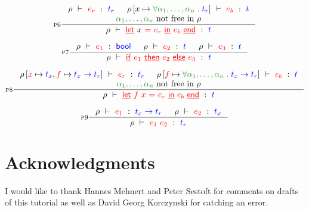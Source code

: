 \documentclass[a4paper]{article}
\newcommand{\RULE}[1]{\textsc{#1}}
\newcommand{\kwd}[1]{\ensuremath{\mathsf{\textcolor{term}{\underline{#1}}}}}
\newcommand{\expr}[1]{\ensuremath{\textcolor{term}{#1}}}
\newcommand{\type}[1]{\ensuremath{\textcolor{blue}{#1}}}
\newcommand{\context}[1]{\ensuremath{\textcolor{black}{#1}}}
\newcommand{\scheme}[1]{\ensuremath{\textcolor{ForestGreen}{#1}}}
\newcommand{\black}[1]{\textcolor{black}{#1}}
\newcommand{\const}[1]{\mathsf{#1}}
\newcommand{\typing}[3]{\ensuremath{#1\ \vdash\ #2\ :\ #3}}
\newcommand{\app}[2]{#1\ #2}
\newcommand{\IF}[3]{\kwd{if}\ #1\ \kwd{then}\ #2\ \kwd{else}\ #3}
\newcommand{\LET}[3]{\kwd{let}\ #1\ \textcolor{term}{=}\ #2\ \kwd{in}\ #3\ \kwd{end}}
\newcommand{\LETF}[4]{\kwd{let}\ #1\ #2\ \textcolor{term}{=}\ #3\ \kwd{in}\ #4\ \kwd{end}}
\newcommand\BOOL{\type{\const{bool}}}
\newcommand{\fn}[2]{#1\;\type{\to}\;#2}
\newcommand\FORALL[2]{\scheme{\forall #1\;.\;#2}}
\newcommand\ALPHAS[1][n]{\alpha_1,\ldots,\alpha_{#1}}
\newcommand{\WITH}[2]{\context{#1\left[#2\right]}}
\newcommand{\RHO}{\context{\rho}}
\begin{document}
\begin{displaymath}
  \inference[\RULE{p6}]{
    \typing{\RHO}{\expr{e_r}}{\type{t_r}} &
    \typing{
      \WITH{\RHO}{\black{x} \mapsto \FORALL{\ALPHAS}{\type{t_r}}}
    }{
      \expr{e_b}
    }{
      \type{t}
    } \\
    \text{$\scheme{\ALPHAS}$ not free in $\RHO$}
  }{
    \typing{\RHO}{\LET{x}{\expr{e_r}}{\expr{e_b}}}{\type{t}}
  }
\end{displaymath}


\begin{displaymath}
  \inference[\RULE{p7}]{
    \typing{\RHO}{\expr{e_1}}{\BOOL} &
    \typing{\RHO}{\expr{e_2}}{\type{t}} &
    \typing{\RHO}{\expr{e_3}}{\type{t}}
  }{
    \typing{\RHO}{\IF{\expr{e_1}}{\expr{e_2}}{\expr{e_3}}}{\type{t}}
  }
\end{displaymath}

\begin{displaymath}
  \inference[\RULE{p8}]{
    \typing{
      \WITH{\RHO}{\expr{x} \mapsto \type{t_x}, \expr{f}\mapsto \type{\fn{t_x}{t_r}}}
    }{
      \expr{e_r}
    }{
      \type{t_r}
    } &
    \typing{
      \WITH{\RHO}{\expr{f}\mapsto\FORALL{\ALPHAS}{\type{\fn{t_x}{t_r}}}}
    }{
      \expr{e_b}
    }{
      \type{t}
    }\\
    \text{$\scheme{\ALPHAS}$ not free in $\RHO$}
  }{
    \typing{\RHO}{\LETF{\expr{f}}{\expr{x}}{\expr{e_r}}{\expr{e_b}}}{\type{t}}
  }
\end{displaymath}

\begin{displaymath}
  \inference[\RULE{p9}]{
    \typing{\RHO}{\expr{e_1}}{\type{\fn{t_x}{t_r}}} &
    \typing{\RHO}{\expr{e_2}}{\type{t_x}}
  }{
    \typing{\RHO}{\expr{\app{e_1}{e_2}}}{\type{t_r}}
  }
\end{displaymath}

\section*{Acknowledgments}
I would like to thank Hannes Mehnert and Peter Sestoft for comments on drafts
of this tutorial as well as David Georg Korczynski for catching an error.



\end{document}
